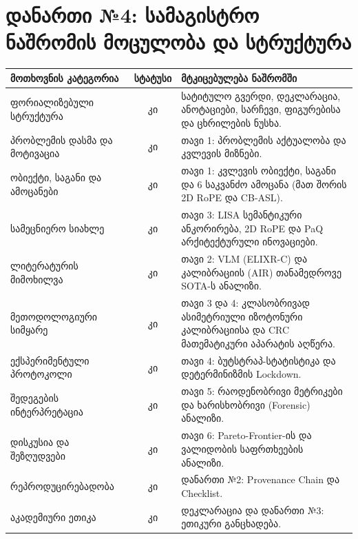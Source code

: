 \documentclass[12pt,a4paper,oneside]{report}
\begin{document}
\chapter*{დანართი №4: სამაგისტრო ნაშრომის მოცულობა და სტრუქტურა}
\vspace{-0.5cm}
\begin{table}[H]
\small
\centering
\begin{tabularx}{\textwidth}{>{\raggedright\arraybackslash}p{} c L}
\toprule
\textbf{მოთხოვნის კატეგორია} & \textbf{სტატუსი} & \textbf{მტკიცებულება ნაშრომში} \\
\midrule
ფორიალიზებული სტრუქტურა & კი & სატიტულო გვერდი, დეკლარაცია, ანოტაციები, სარჩევი, ფიგურებისა და ცხრილების ნუსხა. \\
პრობლემის დასმა და მოტივაცია & კი & თავი 1: პრობლემის აქტუალობა და კვლევის მიზნები. \\
ობიექტი, საგანი და ამოცანები & კი & თავი 1: კვლევის ობიექტი, საგანი და 6 საკვანძო ამოცანა (მათ შორის 2D RoPE და CB-ASL). \\
სამეცნიერო სიახლე & კი & თავი 3: LISA სემანტიკური ანკორირება, 2D RoPE და PaQ არქიტექტურული ინოვაციები. \\
ლიტერატურის მიმოხილვა & კი & თავი 2: VLM (ELIXR-C) და კალიბრაციის (AIR) თანამედროვე SOTA-ს ანალიზი. \\
მეთოდოლოგიური სიმყარე & კი & თავი 3 და 4: კლასობრივად ასიმეტრიული იზოტონური კალიბრაციისა და CRC მათემატიკური აპარატის აღწერა. \\
ექსპერიმენტული პროტოკოლი & კი & თავი 4: ბუტსტრაპ-სტატისტიკა და დეტერმინიზმის Lockdown. \\
შედეგების ინტერპრეტაცია & კი & თავი 5: რაოდენობრივი მეტრიკები და ხარისხობრივი (Forensic) ანალიზი. \\
დისკუსია და შეზღუდვები & კი & თავი 6: Pareto-Frontier-ის და ვალიდობის საფრთხეების ანალიზი. \\
რეპროდუცირებადობა & კი & დანართი №2: Provenance Chain და Checklist. \\
აკადემიური ეთიკა & კი & დეკლარაცია და დანართი №3: ეთიკური განცხადება. \\
\bottomrule
\end{tabularx}
\end{table}
\end{document}
